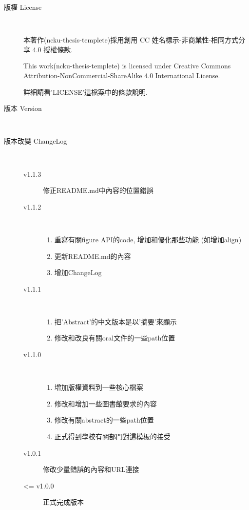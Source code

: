 \begin{description}
  \item[版權 License] \hfill \\

    本著作(ncku-thesis-templete)採用創用 CC 姓名標示-非商業性-相同方式分享 4.0 授權條款.

    This work(ncku-thesis-templete) is licensed under Creative Commons Attribution-NonCommercial-ShareAlike 4.0 International License.

  詳細請看'LICENSE'這檔案中的條款說明.

  \item[版本 Version] \hfill \\
    \ThisThesisVersion

  \item[版本改變 ChangeLog] \hfill \\
    \begin{description}
      \item[v1.1.3] 修正README.md中內容的位置錯誤

      \item[v1.1.2] \hfill \\
        \begin{enumerate}
          \item 重寫有關figure API的code, 增加和優化那些功能 (如增加align)
          \item 更新README.md的內容
          \item 增加ChangeLog
        \end{enumerate}

      \item[v1.1.1] \hfill \\
        \begin{enumerate}
          \item 把'Abstract'的中文版本是以'摘要'來顯示
          \item 修改和改良有關oral文件的一些path位置
        \end{enumerate}

      \item[v1.1.0] \hfill \\
        \begin{enumerate}
          \item 增加版權資料到一些核心檔案
          \item 修改和增加一些圖書館要求的內容
          \item 修改有關abstract的一些path位置
          \item 正式得到學校有關部門對這模板的接受
        \end{enumerate}

      \item[v1.0.1] 修改少量錯誤的內容和URL連接

      \item[<= v1.0.0] 正式完成版本
    \end{description}
\end{description}

\EndChapter
